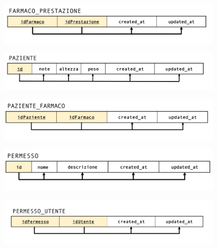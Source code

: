 \documentclass[paper=a4, fontsize=11pt,x11names]{report}
\begin{document}
\begin{figure}[H]
\begin{center}
\includegraphics[scale=0.35]{immagini_normalizzazione/farmaco_prestazione}
\end{center}
\end{figure}

\begin{figure}[H]
\begin{center}
\includegraphics[scale=0.35]{immagini_normalizzazione/paziente}
\end{center}
\end{figure}

\begin{figure}[H]
\begin{center}
\includegraphics[scale=0.35]{immagini_normalizzazione/paziente_farmaco}
\end{center}
\end{figure}

\begin{figure}[H]
\begin{center}
\includegraphics[scale=0.35]{immagini_normalizzazione/permessi}
\end{center}
\end{figure}

\begin{figure}[H]
\begin{center}
\includegraphics[scale=0.33]{immagini_normalizzazione/permessi_utente}
\end{center}
\end{figure}
\end{document}
